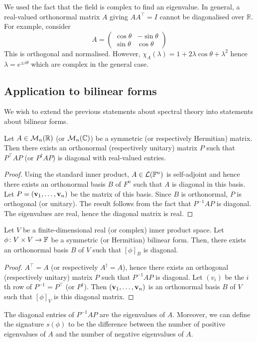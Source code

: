 \documentclass[a4paper]{article}
\begin{document}
\begin{remark}
	We used the fact that the field is complex to find an eigenvalue.
	In general, a real-valued orthonormal matrix \( A \) giving \( A A^\top = I \) cannot be diagonalised over \( \mathbb R \).
	For example, consider
	\[
		A = \begin{pmatrix}
			\cos\theta & -\sin\theta \\
			\sin\theta & \cos\theta
		\end{pmatrix}
	\]
	This is orthogonal and normalised.
	However, \( \chi_A(\lambda) = 1 + 2\lambda \cos\theta + \lambda^2 \) hence \( \lambda = e^{\pm i \theta} \) which are complex in the general case.
\end{remark}

\subsection{Application to bilinear forms}
We wish to extend the previous statements about spectral theory into statements about bilinear forms.
\begin{corollary}
	Let \( A \in {\mathcal{M}}_n(\mathbb R) \) (or \( {\mathcal{M}}_n(\mathbb C) \)) be a symmetric (or respectively Hermitian) matrix.
	Then there exists an orthonormal (respectively unitary) matrix \( P \) such that \( P^\top A P \) (or \( P^\dagger A P \)) is diagonal with real-valued entries.
\end{corollary}
\begin{proof}
	Using the standard inner product, \( A \in {\mathcal{L}}({\mathbb{F}}^n) \) is self-adjoint and hence there exists an orthonormal basis \( B \) of \( F^n \) such that \( A \) is diagonal in this basis.
	Let \( P = ({\bf v}_1, \dots, {\bf v}_n) \) be the matrix of this basis.
	Since \( B \) is orthonormal, \( P \) is orthogonal (or unitary).
	The result follows from the fact that \( P^{-1} A P \) is diagonal.
	The eigenvalues are real, hence the diagonal matrix is real.
\end{proof}
\begin{corollary}
	Let \( V \) be a finite-dimensional real (or complex) inner product space.
	Let \( \phi \colon V \times V \to {\mathbb{F}} \) be a symmetric (or Hermitian) bilinear form.
	Then, there exists an orthonormal basis \( B \) of \( V \) such that \( [\phi]_B \) is diagonal.
\end{corollary}
\begin{proof}
	\( A^\top = A \) (or respectively \( A^\dagger = A \)), hence there exists an orthogonal (respectively unitary) matrix \( P \) such that \( P^{-1} A P \) is diagonal.
	Let \( (v_i) \) be the \( i \)th row of \( P^{-1} = P^\top \) (or \( P^\dagger \)).
	Then \( ({\bf v}_1, \dots, {\bf v}_n) \) is an orthonormal basis \( B \) of \( V \) such that \( [\phi]_V \) is this diagonal matrix.
\end{proof}
\begin{remark}
	The diagonal entries of \( P^{-1} A P \) are the eigenvalues of \( A \).
	Moreover, we can define the signature \( s(\phi) \) to be the difference between the number of positive eigenvalues of \( A \) and the number of negative eigenvalues of \( A \).
\end{remark}
\end{document}

